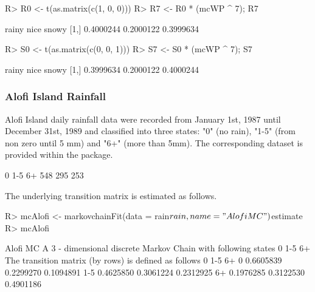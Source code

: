 \documentclass[nojss]{jss}
\begin{document}
\begin{Schunk}
\begin{Sinput}
R> R0 <- t(as.matrix(c(1, 0, 0)))
R> R7 <- R0 * (mcWP ^ 7); R7
\end{Sinput}
\begin{Soutput}
         rainy      nice     snowy
[1,] 0.4000244 0.2000122 0.3999634
\end{Soutput}
\begin{Sinput}
R> S0 <- t(as.matrix(c(0, 0, 1)))
R> S7 <- S0 * (mcWP ^ 7); S7
\end{Sinput}
\begin{Soutput}
         rainy      nice     snowy
[1,] 0.3999634 0.2000122 0.4000244
\end{Soutput}
\end{Schunk}

\subsubsection{Alofi Island Rainfall}\label{sec:wfAlofi}

Alofi Island daily rainfall
data were recorded from January 1st, 1987 until December 31st, 1989 and
classified into three states: "0" (no rain), "1-5" (from non zero until 5 mm) and "6+" (more than 5mm). The corresponding dataset is provided within the
 package.

\begin{Schunk}
\begin{Soutput}
  0 1-5  6+ 
548 295 253 
\end{Soutput}
\end{Schunk}

The underlying transition matrix is estimated as follows.

\begin{Schunk}
\begin{Sinput}
R> mcAlofi <- markovchainFit(data = rain$rain, name = "Alofi MC")$estimate
R> mcAlofi
\end{Sinput}
\begin{Soutput}
Alofi MC 
 A  3 - dimensional discrete Markov Chain with following states 
 0 1-5 6+ 
 The transition matrix   (by rows)  is defined as follows 
            0       1-5        6+
0   0.6605839 0.2299270 0.1094891
1-5 0.4625850 0.3061224 0.2312925
6+  0.1976285 0.3122530 0.4901186
\end{Soutput}
\end{Schunk}
\end{document}
